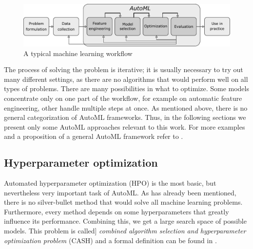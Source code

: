\begin{figure}[h]\centering
\includegraphics[width=\textwidth]{../img/workflow-pdfa.pdf}
\caption{A typical machine learning workflow}
\label{pic01:workflow}
\end{figure}

The process of solving the problem is iterative; it is usually necessary to try
out many different settings, as there are no algorithms that would perform
well on all types of problems.
There are many possibilities in what to optimize. Some models concentrate only
on one part of the workflow, for example on automatic feature engineering,
other handle multiple steps at once. As mentioned above, there is no general
categorization %
of AutoML frameworks. Thus, in the following sections we present only some
AutoML approaches relevant to this work. For more examples and a proposition
of a general AutoML framework refer to \cite{DBLP:journals/corr/abs-1810-13306}.




\subsection{Hyperparameter optimization}
Automated hyperparameter optimization (HPO) is the most basic, but nevertheless
very important task of AutoML. As has already been mentioned, there is no
silver-bullet method that would solve all machine learning problems.
Furthermore, every method depends on some hyperparameters that greatly
influence its performance. Combining this, we get a large search space of
possible models. This problem is called]
\emph{combined algorithm selection and hyperparameter optimization problem}
(CASH) and a formal definition can be found in
\citep{DBLP:journals/corr/abs-1208-3719}.

